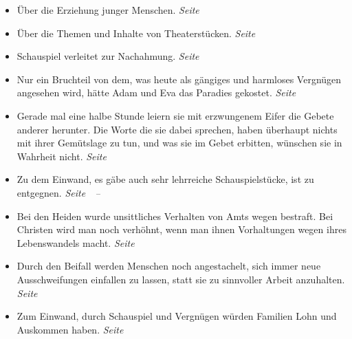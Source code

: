 \begin{itemize}
\begin{itemize}
 \item Über die Erziehung junger Menschen.
 \dotfill \textit{Seite~\pageref{ref:17_01_erziehung}}\\

 \item Über die Themen und Inhalte von Theaterstücken.
 \dotfill \textit{Seite~\pageref{ref:17_01_schauspiel}}\\

 \item Schauspiel verleitet zur Nachahmung.
 \dotfill \textit{Seite~\pageref{ref:17_01_schauspiel_2}}\\

 \item Nur ein Bruchteil von dem, was heute als gängiges und harmloses Vergnügen
angesehen wird, hätte Adam und Eva das Paradies gekostet.
 \dotfill \textit{Seite~\pageref{ref:17_02_adam_und_eva}}\\

 \item Gerade mal eine halbe Stunde leiern sie mit erzwungenem Eifer die Gebete
anderer herunter. Die Worte die sie dabei sprechen, haben überhaupt nichts mit
ihrer Gemütslage zu tun, und was sie im Gebet erbitten, wünschen sie in Wahrheit
nicht.
 \dotfill \textit{Seite~\pageref{ref:17_04_gottesdienst}}\\

 \item Zu dem Einwand, es gäbe auch sehr lehrreiche Schauspielstücke, ist zu entgegnen.
 \dotfill
 \textit{
 Seite~\pageref{ref:17_07_einwand}~--~\pageref{ref:17_07_einwand_ende}}\\

 \item Bei den Heiden wurde unsittliches Verhalten von Amts wegen bestraft. Bei
Christen wird man noch verhöhnt, wenn man ihnen Vorhaltungen wegen ihres
Lebenswandels macht.
 \dotfill \textit{Seite~\pageref{ref:17_08_sittenwaechter}}\\

 \item Durch den Beifall werden Menschen noch angestachelt, sich immer neue
Ausschweifungen einfallen zu lassen, statt sie zu sinnvoller Arbeit anzuhalten.
 \dotfill \textit{Seite~\pageref{ref:17_09_bedarf_wecken}}\\

 \item Zum Einwand, durch Schauspiel und Vergnügen würden Familien Lohn und
Auskommen haben.
 \dotfill \textit{Seite~\pageref{ref:17_10_einwand}}\\


\end{itemize}
\end{itemize}
